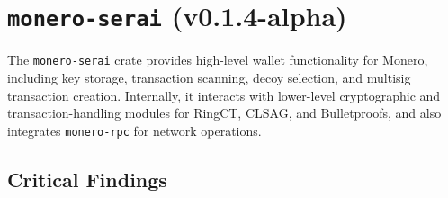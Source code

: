 \documentclass[12pt,a4paper]{article}
\begin{document}



\section{\texttt{monero-serai} (v0.1.4-alpha)}
The \texttt{monero-serai} crate provides high-level wallet functionality for Monero, including key storage, transaction scanning, decoy selection, and multisig transaction creation. Internally, it interacts with lower-level cryptographic and transaction-handling modules for RingCT, CLSAG, and Bulletproofs, and also integrates \texttt{monero-rpc} for network operations.

\vspace{1em}
\subsection{Critical Findings}
\end{document}
